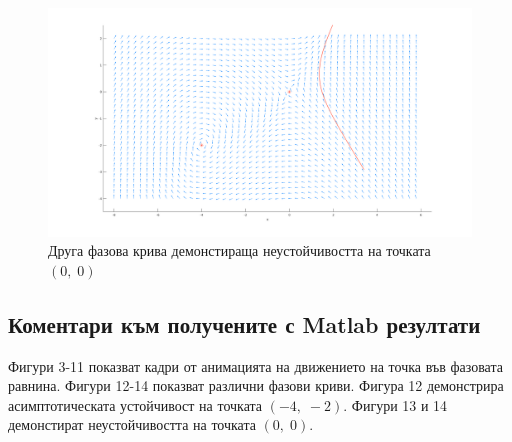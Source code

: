 \documentclass[a4paper, 12pt]{article}
\begin{document}
\begin{figure}[ht]
    \centering
    \includegraphics[width=\textwidth]{moveC.png}
    \caption{Друга фазова крива демонстираща неустойчивостта на точката $(0, \; 0)$}
\end{figure}

\subsection{Коментари към получените с Matlab резултати}
Фигури 3-11 показват кадри от анимацията на движението на точка
във фазовата равнина. Фигури 12-14 показват различни фазови криви.
Фигура 12 демонстрира асимптотическата устойчивост на точката $(-4, \; -2)$.
Фигури 13 и 14 демонстират неустойчивостта на точката $(0, \; 0)$.
\end{document}
